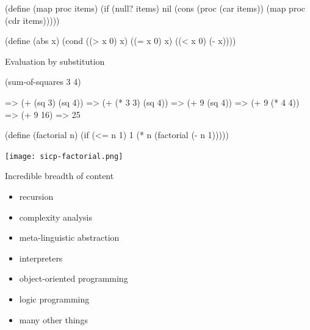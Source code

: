 \documentclass[UKenglish,usenames,dvipsnames,svgnames,table,aspectratio=169,mathserif]{beamer}
\newcommand{\nl}{\vspace{\baselineskip}}
\begin{document}
\begin{frame}[fragile]
\begin{schemecode}
(define (map proc items)
  (if (null? items)
      nil
      (cons (proc (car items))
            (map proc (cdr items)))))
\end{schemecode}
\end{frame}


\begin{frame}[fragile]
\begin{schemecode}
(define (abs x)
  (cond ((> x 0) x)
        ((= x 0) x)
        ((< x 0) (- x))))
\end{schemecode}
\end{frame}


\begin{frame}[fragile]
Evaluation by substitution

\nl
\begin{schemecode}
     (sum-of-squares 3 4)

=>   (+ (sq 3) (sq 4))
=>   (+ (* 3 3) (sq 4))
=>   (+ 9 (sq 4))
=>   (+ 9 (* 4 4))
=>   (+ 9 16)
=>   25
\end{schemecode}
\end{frame}


\begin{frame}[fragile]
\begin{schemecode}
(define (factorial n)
  (if (<= n 1)
      1
      (* n (factorial (- n 1)))))
\end{schemecode}
\end{frame}


\begin{frame}
\centering
\texttt{[image: sicp-factorial.png]}
\end{frame}


\begin{frame}
\begin{center}
Incredible breadth of content
\begin{itemize}
\item recursion
\item complexity analysis
\item meta-linguistic abstraction
\item interpreters
\item object-oriented programming
\item logic programming
\item many other things
\end{itemize}
\end{center}
\end{frame}
\end{document}
